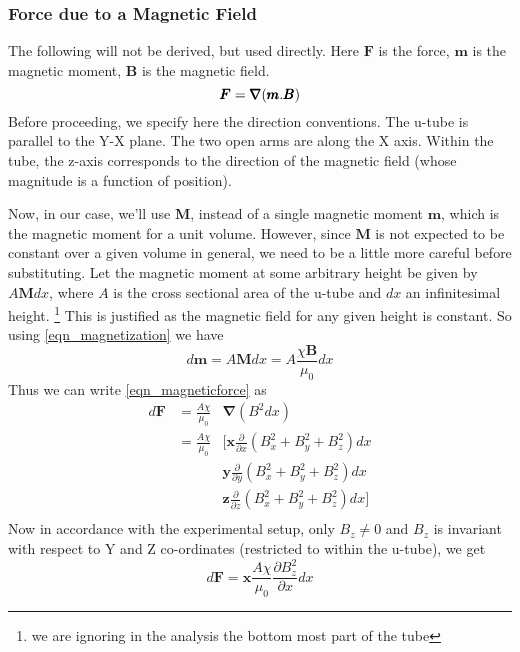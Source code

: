 		\subsubsection{Force due to a Magnetic Field}
			The following will not be derived, but used directly. Here $\pmb F$ is the force, $\pmb m$ is the magnetic moment, $\pmb B$ is the magnetic field.
			\begin{equation}{\label{eqn_magneticforce}}
				\pmb F = \pmb \nabla (\pmb m.\pmb B)
			\end{equation}
			Before proceeding, we specify here the direction conventions. The u-tube is parallel to the Y-X plane. The two open arms are along the X axis. Within the tube, the z-axis corresponds to the direction of the magnetic field (whose magnitude is a function of position). 
			\par
			Now, in our case, we'll use $\pmb M$, instead of a single magnetic moment $\pmb m$, which is the magnetic moment for a unit volume. However, since $\pmb M$ is not expected to be constant over a given volume in general, we need to be a little more careful before substituting. Let the magnetic moment at some arbitrary height be given by $A \pmb M dx$, where $A$ is the cross sectional area of the u-tube and $dx$ an infinitesimal height. \footnote {we are ignoring in the analysis the bottom most part of the tube} This is justified as the magnetic field for any given height is constant. So using \autoref{eqn_magnetization} we have
			\begin{equation}
				d\pmb m = A \pmb M dx = A \frac{\chi \pmb B} {\mu_0} dx
			\end{equation}
			Thus we can write \autoref{eqn_magneticforce} as
			\begin{equation}
			\begin{split}
				d\pmb F &= \frac {A \chi} {\mu_0} &\pmb \nabla (B^2 dx) \\
						&= \frac {A \chi} {\mu_0} &[\pmb x \frac{\partial}{\partial x} (B_x^2 + B_y^2 + B_z^2)dx \\
						& & \pmb y \frac{\partial}{\partial y} (B_x^2 + B_y^2 + B_z^2)dx \\
						& & \pmb z \frac{\partial}{\partial z} (B_x^2 + B_y^2 + B_z^2)dx]\\
			\end{split}
			\end{equation}
			Now in accordance with the experimental setup, only $B_z \neq 0$ and $B_z$ is invariant with respect to Y and Z co-ordinates (restricted to within the u-tube), we get
			\begin{equation}
				d\pmb F = \pmb x \frac {A \chi} {\mu_0} \frac{\partial B_z^2}{\partial x} dx
			\end{equation}
